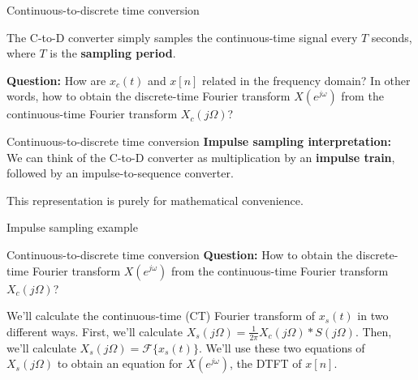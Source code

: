 \documentclass[10pt]{beamer}
\begin{document}
%
\begin{frame}{Continuous-to-discrete time conversion}

The C-to-D converter simply samples the continuous-time signal every $T$ seconds, where $T$ is the \textbf{sampling period}. 
\begin{center}
	\resizebox{0.5\linewidth}{!}{}
\end{center}

\pause
\textbf{Question:} How are $x_c(t)$ and $x[n]$ related in the frequency domain? In other words, how to obtain the discrete-time Fourier transform $X(e^{j\omega})$ from the continuous-time Fourier transform $X_c(j\Omega)$?
\end{frame}

%
\begin{frame}{Continuous-to-discrete time conversion}
\textbf{Impulse sampling interpretation:}\\
We can think of the C-to-D converter as multiplication by an \textbf{impulse train}, followed by an impulse-to-sequence converter. 

This representation is purely for mathematical convenience.
\begin{center}
	\resizebox{\linewidth}{!}{}
\end{center}

\end{frame}

\begin{frame}{Impulse sampling example}
\vspace{-0.4cm}
\begin{center}
	\resizebox{0.9\linewidth}{!}{}
\end{center}
\end{frame}

\begin{frame}{Continuous-to-discrete time conversion}
\textbf{Question:} How to obtain the discrete-time Fourier transform $X(e^{j\omega})$ from the continuous-time Fourier transform $X_c(j\Omega)$?
\begin{center}
	\resizebox{\linewidth}{!}{}
\end{center}

We'll calculate the continuous-time (CT) Fourier transform of $x_s(t)$ in two different ways. First, we'll calculate $X_s(j\Omega) = \frac{1}{2\pi}X_c(j\Omega)\ast S(j\Omega)$. Then, we'll calculate $X_s(j\Omega) = \mathcal{F}\{x_s(t)\}$. We'll use these two equations of $X_s(j\Omega)$ to obtain an equation for $X(e^{j\omega})$, the DTFT of $x[n]$.

\end{frame}
\end{document}
